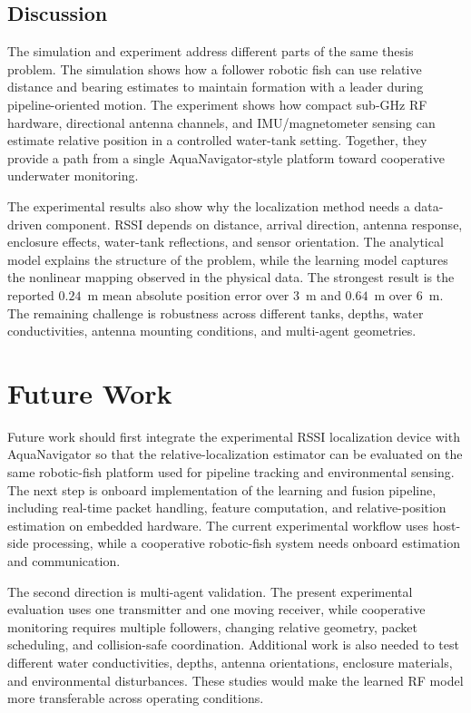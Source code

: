 \documentclass{uhcoethesis}
\begin{document}
\subsection{Discussion}

The simulation and experiment address different parts of the same thesis problem. The simulation shows how a follower robotic fish can use relative distance and bearing estimates to maintain formation with a leader during pipeline-oriented motion. The experiment shows how compact sub-GHz RF hardware, directional antenna channels, and IMU/magnetometer sensing can estimate relative position in a controlled water-tank setting. Together, they provide a path from a single AquaNavigator-style platform toward cooperative underwater monitoring.

The experimental results also show why the localization method needs a data-driven component. RSSI depends on distance, arrival direction, antenna response, enclosure effects, water-tank reflections, and sensor orientation. The analytical model explains the structure of the problem, while the learning model captures the nonlinear mapping observed in the physical data. The strongest result is the reported $0.24$~m mean absolute position error over 3~m and $0.64$~m over 6~m. The remaining challenge is robustness across different tanks, depths, water conductivities, antenna mounting conditions, and multi-agent geometries.

\section{Future Work}

Future work should first integrate the experimental RSSI localization device with AquaNavigator so that the relative-localization estimator can be evaluated on the same robotic-fish platform used for pipeline tracking and environmental sensing. The next step is onboard implementation of the learning and fusion pipeline, including real-time packet handling, feature computation, and relative-position estimation on embedded hardware. The current experimental workflow uses host-side processing, while a cooperative robotic-fish system needs onboard estimation and communication.

The second direction is multi-agent validation. The present experimental evaluation uses one transmitter and one moving receiver, while cooperative monitoring requires multiple followers, changing relative geometry, packet scheduling, and collision-safe coordination. Additional work is also needed to test different water conductivities, depths, antenna orientations, enclosure materials, and environmental disturbances. These studies would make the learned RF model more transferable across operating conditions.
\end{document}
